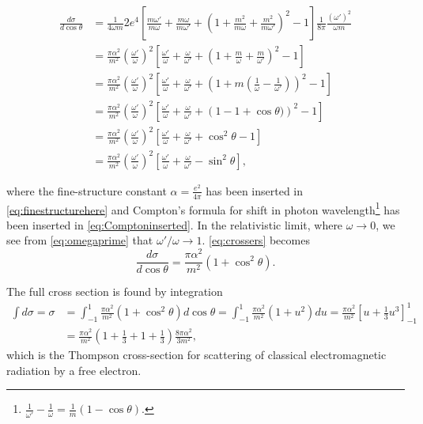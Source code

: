 \documentclass[11pt, a4paper]{amsart}
\begin{document}
\begin{align}
\frac{d\sigma}{d\cos\theta} &= \frac{1}{4\omega m} 2e^4 \left[\frac{m\omega'}{m\omega} + \frac{m\omega}{m\omega'} + \left(1 + \frac{m^2}{m\omega} + \frac{m^2}{m\omega'} \right)^2 - 1 \right] \frac{1}{8\pi} \frac{(\omega')^2}{\omega m} \\
		&= \frac{\pi \alpha^2}{m^2} \left(\frac{\omega'}{\omega} \right)^2 \left[\frac{\omega'}{\omega} + \frac{\omega}{\omega'} + \left( 1 + \frac{m}{\omega} + \frac{m}{\omega'}\right)^2 - 1 \right] \label{eq:finestructurehere} \\
		&= \frac{\pi \alpha^2}{m^2} \left(\frac{\omega'}{\omega} \right)^2 \left[\frac{\omega'}{\omega} + \frac{\omega}{\omega'} + \left( 1  + m (\frac{1}{\omega} - \frac{1}{\omega'})\right)^2 - 1 \right]  \\
		&= \frac{\pi \alpha^2}{m^2} \left(\frac{\omega'}{\omega} \right)^2 \left[\frac{\omega'}{\omega} + \frac{\omega}{\omega'} + \left( 1 - 1 + \cos\theta)\right)^2 - 1 \right] \label{eq:Comptoninserted} \\
		&= \frac{\pi \alpha^2}{m^2} \left(\frac{\omega'}{\omega} \right)^2 \left[\frac{\omega'}{\omega} + \frac{\omega}{\omega'} + \cos^2\theta - 1 \right] \\
		&= \frac{\pi \alpha^2}{m^2} \left(\frac{\omega'}{\omega} \right)^2 \left[\frac{\omega'}{\omega} + \frac{\omega}{\omega'} - \sin^2\theta \right] \label{eq:crossers},
\end{align}

where the fine-structure constant $\alpha = \frac{e^2}{4\pi}$ has been inserted in \autoref{eq:finestructurehere} and Compton's formula for shift in photon wavelength\footnote{$\frac{1}{\omega'} - \frac{1}{\omega} = \frac{1}{m} (1 - \cos\theta)$.} has been inserted in \autoref{eq:Comptoninserted}. In the relativistic limit, where $\omega \to 0$, we see from \autoref{eq:omegaprime} that $\omega' / \omega \to 1$. \autoref{eq:crossers} becomes
\begin{equation}
\frac{d\sigma}{d\cos\theta} = \frac{\pi\alpha^2}{m^2}(1 + \cos^2\theta).
\end{equation}

The full cross section is found by integration
\begin{align}
\int d\sigma = \sigma &= \int_{-1}^1 \frac{\pi\alpha^2}{m^2} (1 + \cos^2 \theta) d\cos\theta 
= \int_{-1}^1 \frac{\pi\alpha^2}{m^2} (1 + u^2) du = \frac{\pi\alpha^2}{m^2}\left[u + \frac{1}{3}u^3 \right]_{-1}^1 \\
	&= \frac{\pi\alpha^2}{m^2} \left(1 + \frac{1}{3} + 1 + \frac{1}{3} \right) \frac{8\pi\alpha^2}{3m^2},
\end{align}
which is the Thompson cross-section for scattering of classical electromagnetic radiation by a free electron.
\end{document}
